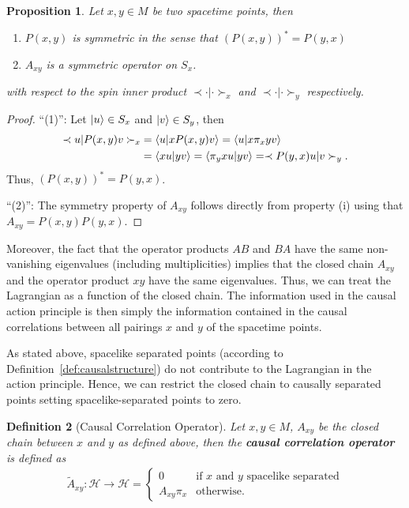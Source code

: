 \documentclass[reqno,11pt]{amsart}
\newcommand{\spinbraket}[2]{\prec #1 | #2 \succ}
\renewcommand{\H}{\mathcal{H}}
\newtheorem{definition}{Definition}[section]
\newtheorem{proposition}[definition]{Proposition}
\numberwithin{equation}{section}
\begin{document}
\begin{proposition} \label{prop:properties-of-closed-chain}
    Let $x, y \in M$ be two spacetime points, then
    \begin{enumerate}
        \item $P(x, y)$ is symmetric in the sense that $\left( P(x, y) \right)^* = P(y, x)$
        \item $A_{xy}$ is a symmetric operator on $S_x$.
    \end{enumerate}
    with respect to the spin inner product $\spinbraket{\cdot}{\cdot}_x$ and $\spinbraket{\cdot}{\cdot}_y$ respectively.
\end{proposition}
\begin{proof}
    ``(1)'': Let $\ket{u} \in S_x$ and $\ket{v} \in S_y$, then
    \begin{align*}
        \spinbraket{u}{P(x, y) v}_x &= \braket{u}{x P(x, y) v} = \braket{u}{x \pi_x y v}\\
        &= \braket{x u}{y v} = \braket{\pi_y x u}{y v} = \spinbraket{P(y, x) u}{v}_y.
    \end{align*}
    Thus, $\left( P(x, y) \right)^* = P(y, x)$.

    \noindent
    ``(2)'': The symmetry property of $A_{xy}$ follows directly from property (i) using that $A_{xy} = P(x, y) P(y, x)$.
\end{proof}

Moreover, the fact that the operator products $AB$ and $BA$ have the same non-vanishing eigenvalues (including multiplicities)
implies that the closed chain $A_{xy}$ and the operator product $xy$ have the same eigenvalues.
Thus, we can treat the Lagrangian as a function of the closed chain.
The information used in the causal action principle is then simply the information contained in the causal correlations
between all pairings $x$ and $y$ of the spacetime points.

As stated above, spacelike separated points (according to Definition~\ref{def:causalstructure}) do not
contribute to the Lagrangian in the action principle.
Hence, we can restrict the closed chain to causally separated points setting spacelike-separated points to zero.

\begin{definition}[Causal Correlation Operator]
    \label{def:causal-correlation-operator}
    Let $x, y \in M$, $A_{xy}$ be the closed chain between $x$ and $y$ as defined above, then the \textbf{causal correlation operator}
    is defined as
    \begin{align}
        \tilde{A}_{xy}: \H \to \H = \begin{cases}
                                          0 & \text{if $x$ and $y$ spacelike separated}\\
                                          A_{xy} \pi_x & \text{otherwise.}
        \end{cases}
    \end{align}
\end{definition}
\end{document}
